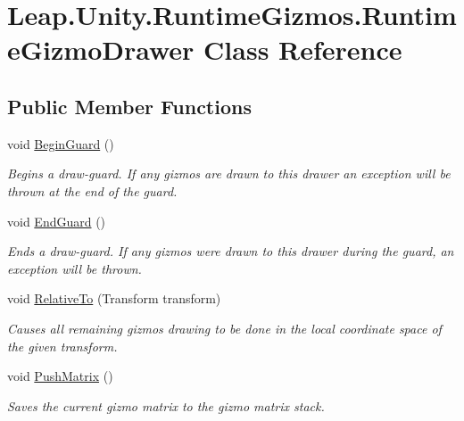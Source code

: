 \hypertarget{class_leap_1_1_unity_1_1_runtime_gizmos_1_1_runtime_gizmo_drawer}{}\section{Leap.\+Unity.\+Runtime\+Gizmos.\+Runtime\+Gizmo\+Drawer Class Reference}
\label{class_leap_1_1_unity_1_1_runtime_gizmos_1_1_runtime_gizmo_drawer}
\subsection*{Public Member Functions}
\begin{DoxyCompactItemize}
\item 
void \mbox{\hyperlink{class_leap_1_1_unity_1_1_runtime_gizmos_1_1_runtime_gizmo_drawer_aabd29ab232c427c79545ceaa2b35a609}{Begin\+Guard}} ()
\begin{DoxyCompactList}\small\item\em Begins a draw-\/guard. If any gizmos are drawn to this drawer an exception will be thrown at the end of the guard. \end{DoxyCompactList}\item 
void \mbox{\hyperlink{class_leap_1_1_unity_1_1_runtime_gizmos_1_1_runtime_gizmo_drawer_af48e1fd2f99c0ae9f58d0441ce35028b}{End\+Guard}} ()
\begin{DoxyCompactList}\small\item\em Ends a draw-\/guard. If any gizmos were drawn to this drawer during the guard, an exception will be thrown. \end{DoxyCompactList}\item 
void \mbox{\hyperlink{class_leap_1_1_unity_1_1_runtime_gizmos_1_1_runtime_gizmo_drawer_a4b64f55ea3bb3996b33e12cfaa8e04bd}{Relative\+To}} (Transform transform)
\begin{DoxyCompactList}\small\item\em Causes all remaining gizmos drawing to be done in the local coordinate space of the given transform. \end{DoxyCompactList}\item 
void \mbox{\hyperlink{class_leap_1_1_unity_1_1_runtime_gizmos_1_1_runtime_gizmo_drawer_a38f0b9ad5162a609201eff87a19e205e}{Push\+Matrix}} ()
\begin{DoxyCompactList}\small\item\em Saves the current gizmo matrix to the gizmo matrix stack. \end{DoxyCompactList}\item 

\end{DoxyCompactItemize}
